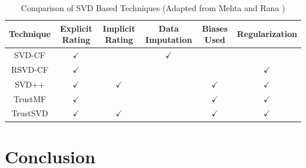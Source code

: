 \documentclass[letter paper, 11pt]{article}
\begin{document}
	\begin{table}[h]
		\centering
		\begin{tabular}{|c|c|c|c|c|c|}
			\hline
			Technique & Explicit Rating & Implicit Rating & Data Imputation & Biases Used & Regularization \\ \hline
			SVD-CF & $\checkmark$ &  & $\checkmark$ &  &  \\ \hline
			RSVD-CF & $\checkmark$ &  & &  & $\checkmark$ \\ \hline
			SVD++ & $\checkmark$ & $\checkmark$ & & $\checkmark$ & $\checkmark$ \\ \hline
			TrustMF & $\checkmark$ &  & & $\checkmark$ & $\checkmark$ \\ \hline
			TrustSVD & $\checkmark$ & $\checkmark$ & & $\checkmark$ & $\checkmark$ \\ \hline
		\end{tabular}
		\caption{Comparison of SVD Based Techniques (Adapted from Mehta and Rana \cite{review})}
		\label{comparison}
	\end{table}
	
	
	\section{Conclusion}

	
	
\end{document}
